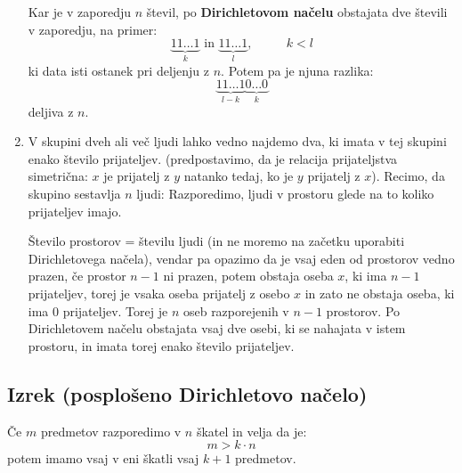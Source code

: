 \begin{enumerate}[label=\roman*.]
    Kar je v zaporedju $n$ števil, po \textbf{Dirichletovom načelu} obstajata dve števili v zaporedju, na primer:
    $$
    \underset{k}{\underbrace{11\ldots 1}} \text{ in } \underset{l}{\underbrace{11\ldots 1}}, \text{ } \text{ }\text{ }\text{ } k < l
    $$
    ki data isti ostanek pri deljenju z $n$. Potem pa je njuna razlika:
    $$
    \underset{l - k}{\underbrace{11\ldots 1}}\underset{k}{\underbrace{0 \ldots 0}}
    $$
    deljiva z $n$.
    \item V skupini dveh ali več ljudi lahko vedno najdemo dva, ki imata v tej skupini enako število prijateljev. (predpostavimo, da je relacija prijateljstva simetrična: $x$ je prijatelj z $y$ natanko tedaj, ko je $y$ prijatelj z $x$). Recimo, da skupino sestavlja $n$ ljudi: Razporedimo, ljudi v prostoru glede na to koliko prijateljev imajo.
    \begin{center}
    \end{center}
    Število prostorov = številu ljudi (in ne moremo na začetku uporabiti Dirichletovega načela), vendar pa opazimo da je vsaj eden od prostorov vedno prazen, če prostor $n - 1$ ni prazen, potem obstaja oseba $x$, ki ima $n - 1$ prijateljev, torej je vsaka oseba prijatelj z osebo $x$ in zato ne obstaja oseba, ki ima 0 prijateljev.
    Torej je $n$ oseb razporejenih v $n-1$ prostorov. Po Dirichletovem načelu obstajata vsaj dve osebi, ki se nahajata v istem prostoru, in imata torej enako število prijateljev.
\end{enumerate}


\subsection{Izrek (posplošeno Dirichletovo načelo)}
Če $m$ predmetov razporedimo v $n$ škatel in velja da je:
$$
m > k \cdot n
$$
potem imamo vsaj v eni škatli vsaj $k + 1$ predmetov. \\[1em]

